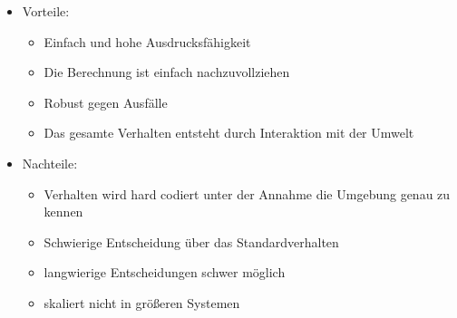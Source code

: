 \documentclass{article} %
\begin{document}
\begin{itemize}
\begin{enumerate}
		\end{enumerate}
		\item Vorteile:
		\begin{itemize}
			\item Einfach und hohe Ausdrucksfähigkeit
			\item Die Berechnung ist einfach nachzuvollziehen
			\item Robust gegen Ausfälle
			\item Das gesamte Verhalten entsteht durch Interaktion mit der Umwelt
		\end{itemize}
		\item Nachteile:
		\begin{itemize}
			\item Verhalten wird hard codiert unter der Annahme die Umgebung genau zu kennen
			\item Schwierige Entscheidung über das Standardverhalten
			\item langwierige Entscheidungen schwer möglich
			\item skaliert nicht in größeren Systemen
		\end{itemize}
	\end{itemize}
\end{document}
